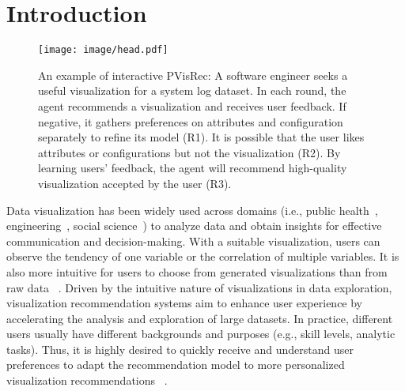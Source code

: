 \section{Introduction}

\begin{figure}[t]
  \centering
  \texttt{[image: image/head.pdf]}
  \vspace{-2em}
  \caption{
  An example of interactive PVisRec: A software engineer seeks a useful visualization for a system log dataset. 
  In each round, the agent recommends a visualization and receives user feedback. If negative, it gathers preferences on attributes and configuration separately to refine its model (R1). It is possible that the user likes attributes or configurations but not the visualization (R2). By learning users' feedback, the agent will recommend high-quality visualization accepted by the user (R3).
  } 
  \label{fig:head}
  \vspace{-2em}
\end{figure}

Data visualization has been widely used across domains (i.e., public health~\cite{jia2020big}, engineering~\cite{chiang2017big}, social science~\cite{felt2016social}) to analyze data and obtain insights for effective communication and decision-making. With a suitable visualization, users can observe the tendency of one variable or the correlation of multiple variables. It is also more intuitive for users to choose from generated visualizations than from raw data ~\cite{vartak2015seedb}.
Driven by the intuitive nature of visualizations in data exploration, visualization recommendation systems aim to enhance user experience by accelerating the analysis and exploration of large datasets. 
In practice, different users usually have different backgrounds and purposes (e.g., skill levels, analytic tasks). Thus, it is highly desired to quickly receive and understand user preferences to adapt the recommendation model to more personalized visualization recommendations ~\cite{mutlu_vizrec_2016}. 

